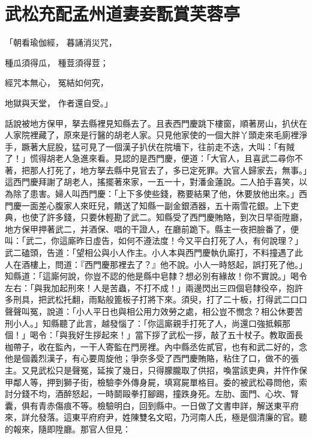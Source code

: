 %

\chapter{武松充配孟州道\KG 妻妾翫賞芙蓉亭}

\begin{showcontents}{}



「朝看瑜伽經，  暮誦消災咒，

種瓜須得瓜，  種荳須得荳；

經咒本無心，  冤結如何究，

地獄與天堂，  作者還自受。」

話說被地方保甲，拏去縣裡見知縣去了。且表西門慶跳下樓窗，順著房山，扒伏在人家院裡藏了，原來是行醫的胡老人家。只見他家使的一個大胖丫頭走來毛廁裡淨手，蹶著大屁股，猛可見了一個漢子扒伏在院墻下，往前走不迭，大叫：「有賊了！」慌得胡老人急進來看。見認的是西門慶，便道：「大官人，且喜武二尋你不著，把那人打死了，地方拏去縣中見官去了，多已定死罪。大官人歸家去，無事。」這西門慶拜謝了胡老人，搖擺著來家，一五一十，對潘金蓮說。二人拍手喜笑，以為除了患害。婦人叫西門慶：「上下多使些錢，務要結果了他，休要放他出來。」西門慶一面差心腹家人來旺兒，饋送了知縣一副金銀酒器，五十兩雪花銀。上下吏典，也使了許多錢，只要休輕勘了武二。知縣受了西門慶賄賂，到次日早衙陞廳，地方保甲押著武二，并酒保、唱的干證人，在廳前跪下。縣主一夜把臉番了，便叫：「武二，你這廝昨日虛告，如何不遵法度！今又平白打死了人，有何說理？」武二磕頭，告道：「望相公與小人作主。小人本與西門慶執仇廝打，不料撞遇了此人在酒樓上，問道：『西門慶那裡去了？』他不說。小人一時怒起，誤打死了他。」知縣道：「這廝何說，你豈不認的他是縣中皂隸？想必別有緣故！你不實說。」喝令左右：「與我加起刑來！人是苦蟲，不打不成！」兩邊閃出三四個皂隸役卒，抱許多刑具，把武松托翻，雨點般篦板子打將下來。須臾，打了二十板，打得武二口口聲聲叫冤，說道：「小人平日也與相公用力效勞之處，相公豈不憫念？相公休要苦刑小人。」知縣聽了此言，越發惱了：「你這廝親手打死了人，尚還口強抵賴那個！」喝令：「與我好生拶起來！」當下拶了武松一拶，敲了五十杖子。教取面長枷帶子，收在監內，一干人寄監在門房裡。內中縣丞佐貳官，也有和武二好的，念他是個義烈漢子，有心要周旋他；爭奈多受了西門慶賄賂，粘住了口，做不的張主。又見武松只是聲冤，延挨了幾日，只得朦朧取了供招，喚當該吏典，并忤作保甲鄰人等，押到獅子街，檢驗李外傳身屍，填寫屍單格目。委的被武松尋問他，索討分錢不均，酒醉怒起，一時鬬毆拳打腳踢，撞跌身死。左肋、面門、心坎、腎囊，俱有青赤傷痕不等。檢驗明白，回到縣中。一日做了文書申詳，解送東平府來，詳允發落。這東平府府尹，姓陳雙名文昭，乃河南人氏，極是個清廉的官。聽的報來，隨即陞廳。那官人但見：


\end{showcontents}
